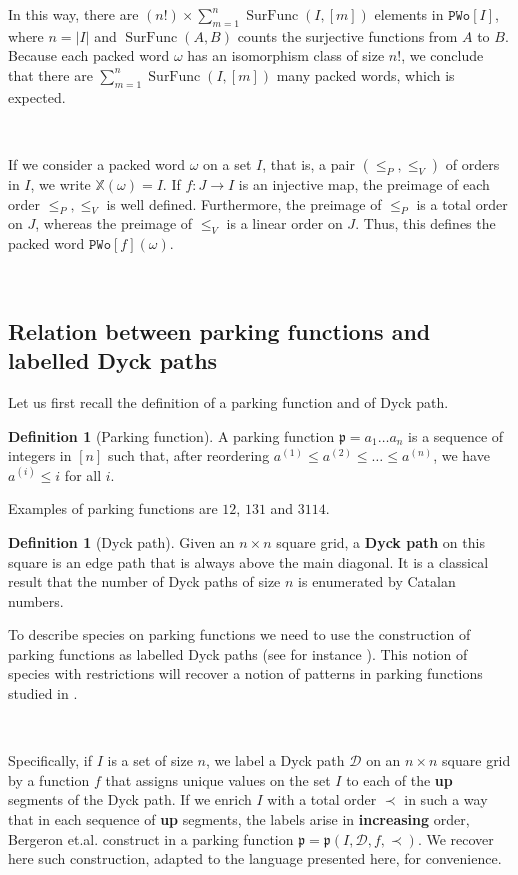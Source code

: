\documentclass[12pt, reqno]{amsart}
\theoremstyle{definition}
\newtheorem{defin}[thm]{Definition}
\DeclareMathOperator{\sFunc}{\mathrm{SurFunc}}
\begin{document}
In this way, there are $(n!) \times \sum_{m = 1}^n \sFunc(I, [m])$ elements in $\mathtt{PWo}[I]$, where $n = |I|$ and $\sFunc(A, B)$ counts the surjective functions from $A$ to $B$.
Because each packed word $\omega $ has an isomorphism class of size $n!$, we conclude that there are $ \sum_{m = 1}^n \sFunc(I, [m])$ many packed words, which is expected.

\

\label{defin:pwo}
If we consider a packed word $\omega$ on a set $I$, that is, a pair $(\leq_P, \leq_V) $ of orders in $I$, we write $\mathbb{X}(\omega) = I$.
If $f:J \to I $ is an injective map, the preimage of each order $\leq_P, \leq_V$ is well defined.
Furthermore, the preimage of $\leq_P$ is a total order on $J$, whereas the preimage of $\leq_V$ is a linear order on $J$.
Thus, this defines the packed word $\mathtt{PWo}[f](\omega )$.

\

\subsection{Relation between parking functions and labelled Dyck paths}

Let us first recall the definition of a parking function and of  Dyck path.

\begin{defin}[Parking function]
A parking function $\mathfrak{p} = a_1 \dots a_n$ is a sequence of integers in $[n]$ such that, after reordering $a^{(1)} \leq a^{(2)} \leq \dots \leq a^{(n)}$, we have $a^{(i)} \leq i$ for all $i$.
\end{defin}

Examples of parking functions are $12$, $131$ and $3114$.

\begin{defin}[Dyck path]
Given an $n\times n$ square grid, a \textbf{Dyck path} on this square is an edge path that is always above the main diagonal.
It is a classical result that the number of Dyck paths of size $n$ is enumerated by Catalan numbers.
\end{defin}


To describe species on parking functions we need to use the construction of parking functions as labelled Dyck paths (see for instance \cite{Loehr}).
This notion of species with restrictions will recover a notion of patterns in parking functions studied in \cite{adeniran2022pattern}.

\

Specifically, if $I$ is a set of size $n$, we label a Dyck path $\mathcal D$ on an $n\times n$ square grid by a function $f$ that assigns unique values on the set $I$ to each of the \textbf{up} segments of the Dyck path.
If we enrich $I$ with a total order $\prec$ in such a way that in each sequence of \textbf{up} segments, the labels arise in \textbf{increasing} order, Bergeron et.al. construct in \cite{BGLPV2021} a parking function $\mathfrak{p} = \mathfrak{p}(I, \mathcal D, f, \prec) $.
We recover here such construction, adapted to the language presented here, for convenience.
\end{document}
